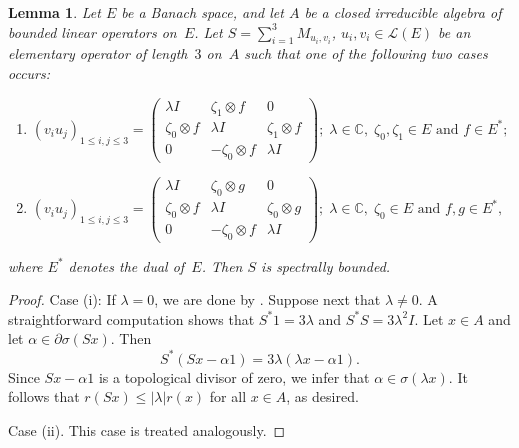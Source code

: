 \documentclass[a4paper,12pt,reqno]{amsart}
\numberwithin{equation}{section}
\newtheorem{lem}[thm]{Lemma}
\theoremstyle{definition}
\begin{document}
\begin{lem}\label{lem:suff-cond}
Let $E$ be a Banach space, and let $A$ be a closed irreducible algebra of bounded linear operators on~$E$.
Let ${S}=\sum_{i=1}^3 M_{u_i,v_i}$, $u_i, v_i \in {{\mathscr L}(E)}$  be an elementary operator of length~$3$ on~$A$
such that one of the following two cases occurs:

\smallskip
\begin{enumerate}
\item[{\rm (i)}] $(v_iu_j)_{1 \leq i,j \leq 3}= \left(\begin{array}{ccc}
                                             \lambda I & \zeta_1 \otimes f & 0 \\
                                             \zeta_0 \otimes f & \lambda I & \zeta_1 \otimes f \\
                                             0 & - \zeta_0 \otimes f &\lambda I
                                           \end{array}\right); \;  \lambda \in {\mathbb{C}}, \; \zeta_0, \zeta_1 \in E \text { and } f \in E^*; $
\smallskip
\item[{\rm (ii)}]                                        $(v_iu_j)_{1 \leq i,j \leq 3}= \left(\begin{array}{ccc}
                                             \lambda I & \zeta_0 \otimes g & 0 \\
                                             \zeta_0 \otimes f & \lambda I & \zeta_0 \otimes g \\
                                             0 & - \zeta_0 \otimes f & \lambda I
                                           \end{array}\right); \; \lambda \in {\mathbb{C}}, \;  \zeta_0 \in E \text { and } f,g \in E^*,$
\end{enumerate}
where $E^*$ denotes the dual of~$E$. Then ${S}$ is spectrally bounded.
\end{lem}
\begin{proof}
Case (i): If $\lambda=0$, we are done by  \cite[Theorem 4.1]{NaMa13}.
Suppose next that $\lambda\neq0$. A straightforward computation shows that $S^*1=3\lambda$ and $S^* S= 3 \lambda^2  I$.
Let $x\in A$ and let $\alpha \in\partial\sigma (Sx)$. Then
\begin{equation*}
S^* (Sx- \alpha 1)= 3 \lambda (\lambda x -\alpha 1).
\end{equation*}
Since $Sx- \alpha 1$ is a topological divisor of zero, we infer that $\alpha\in\sigma(\lambda x)$.
It follows that $r(Sx) \leq  |\lambda|r(x)$ for all $x \in A$, as desired.

\smallskip\noindent
Case (ii). This case is treated analogously.
\end{proof}
\end{document}
